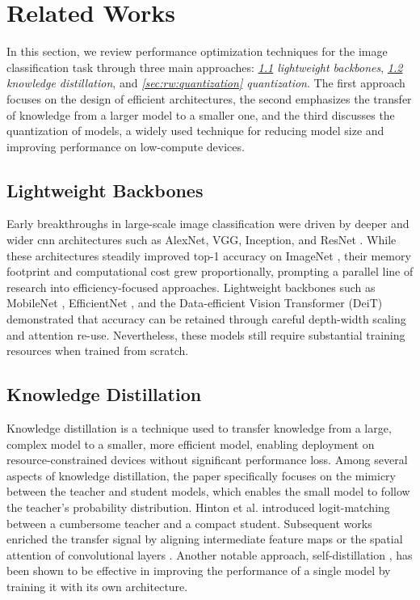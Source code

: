 \section{Related Works}

In this section, we review performance optimization techniques
for the image classification task through three main approaches:
\textit{\ref{sec:rw:lightweight_backbones} lightweight backbones},
\textit{\ref{sec:rw:knowledge_distillation} knowledge distillation},
and \textit{\ref{sec:rw:quantization} quantization}.
The first approach focuses on the design of efficient architectures,
the second emphasizes the transfer of knowledge from a larger model to a smaller one,
and the third discusses the quantization of models,
a widely used technique for reducing model size
and improving performance on low-compute devices.

\subsection{Lightweight Backbones}
\label{sec:rw:lightweight_backbones}

Early breakthroughs in large-scale image classification were driven by deeper and wider \gls*{cnn}
architectures such as AlexNet, VGG, Inception, and ResNet \cite{krizhevsky2012imagenet, simonyan2014very, szegedy2015going, he2016deep}.
While these architectures steadily improved top-1 accuracy on ImageNet \cite{deng2009imagenet},
their memory footprint and computational cost grew proportionally,
prompting a parallel line of research into efficiency-focused approaches.
Lightweight backbones such as MobileNet \cite{howard2017mobilenets,sandler2018mobilenetv2},
EfficientNet \cite{tan2019efficientnet}, and the Data-efficient Vision Transformer (DeiT) \cite{touvron2021training}
demonstrated that accuracy can be retained through careful depth-width scaling and attention re-use.
Nevertheless, these models still require substantial training resources when trained from scratch.

\subsection{Knowledge Distillation}
\label{sec:rw:knowledge_distillation}

Knowledge distillation is a technique used to transfer knowledge
from a large, complex model to a smaller, more efficient model,
enabling deployment on resource-constrained devices without significant performance loss.
Among several aspects of knowledge distillation,
the paper specifically focuses on the mimicry between the teacher and student models,
which enables the small model to follow the teacher's probability distribution.
Hinton et al. \cite{hinton2015distilling} introduced logit-matching between a cumbersome teacher and a compact student.
Subsequent works enriched the transfer signal by aligning intermediate feature maps \cite{romero2014fitnets}
or the spatial attention of convolutional layers \cite{zagoruyko2016paying}.
Another notable approach, self-distillation \cite{zhang2019your},
has been shown to be effective in improving the performance of a single model
by training it with its own architecture.

